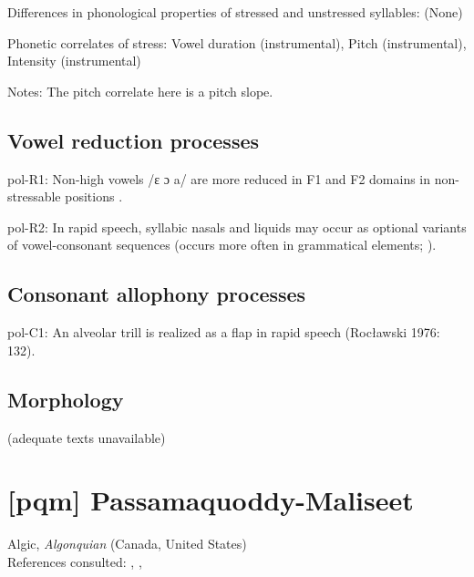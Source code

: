 {\begin{appendixdesc}
\item[Differences in phonological properties of stressed and unstressed syllables:] (None)

\item[Phonetic correlates of stress:] Vowel duration (instrumental), Pitch (instrumental), Intensity (instrumental)

\item[Notes:] The pitch correlate here is a pitch slope.
\end{appendixdesc}
\subsection*{Vowel reduction processes}
\begin{appendixdesc}

\item[pol-R1:] Non-high vowels /ɛ ɔ a/ are more reduced in F1 and F2 domains in non-stressable positions \citep[378--379]{Nowak2006}.

\item[pol-R2:] In rapid speech, syllabic nasals and liquids may occur as optional variants of vowel-consonant sequences (occurs more often in grammatical elements; \citealt{Rubach1974}).
\end{appendixdesc}
\subsection*{Consonant allophony processes}
\begin{appendixdesc}

\item[pol-C1:] An alveolar trill is realized as a flap in rapid speech (Rocławski 1976: 132).
\end{appendixdesc}
\subsection*{Morphology}

(adequate texts unavailable)

\section*{[pqm] Passamaquoddy-Maliseet}  %
Algic, \textit{Algonquian} (Canada, United States)\medskip\\
References consulted: \citet{Leavitt1996}, \citet{LeSourd1993}, \citet{Sherwood1986}

}
